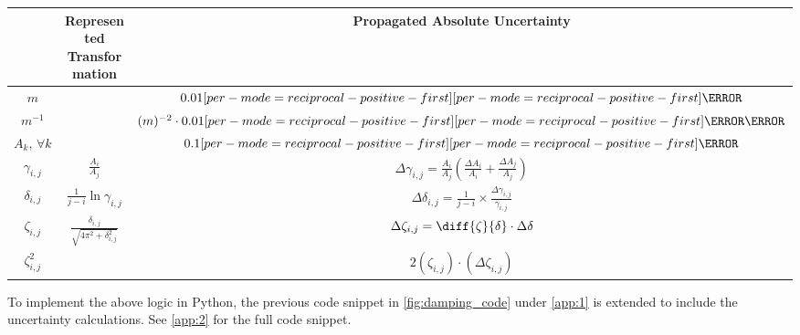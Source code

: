 \documentclass[a4paper,12pt]{article}
\let\oldsi\si
\renewcommand{\si}[1]{\oldsi[per-mode=reciprocal-positive-first]{#1}}
\newcommand{\thcolor}{\cellcolor{Blue!25}}
\newcommand{\chcolor}{\cellcolor{RedOrange!25}}
\begin{document}
\begin{table}[H]
  \begin{center}
    \bgroup
    \renewcommand{\arraystretch}{1.5}
    \begin{tabular}{|c|c|c|}
      \hline
      \thcolor {Variable}       & \thcolor Represented Transformation                   & \thcolor Propagated Absolute Uncertainty                                                          \\ \hline
      $m$                       &                                                       & $0.01\si{\g}$                                                                                     \\ \hline
      \chcolor $m^{-1}$         & \chcolor                                              & \chcolor $(m)^{-2}\cdot 0.01\si{\per\g}$                                                          \\ \hline
      $A_k,\,\forall k$         &                                                       & $0.1\si{\cm}$                                                                                     \\ \hline
      $\gamma_{i,j}$            & $\frac{A_i}{A_{j}}$                                   & $\Delta \gamma_{i, j} = \frac{A_i}{A_{j}}(\frac{\Delta A_i}{A_{i}} + \frac{\Delta A_{j}}{A_{j}})$ \\ \hline
      $\delta_{i,j}$            & $\frac{1}{j - i}\ln{\gamma_{i,j}}$                    & $\Delta \delta_{i,j} = \frac{1}{j - i}\times \frac{\Delta \gamma_{i,j}}{\gamma_{i,j}}$            \\ \hline
      $\zeta_{i, j}$            & $\frac{\delta_{i,j}}{\sqrt{4\pi^2 + \delta_{i,j}^2}}$ & $\Delta \zeta_{i, j} = \diff{\zeta}{\delta} \cdot \Delta\delta$                                   \\ \hline
      \chcolor $\zeta_{i, j}^2$ & \chcolor                                              & \chcolor $2(\zeta_{i, j})\cdot (\Delta \zeta_{i, j})$                                             \\ \hline
    \end{tabular}
    \label{tab:6}
    \egroup
  \end{center}
\end{table}

\vspace{\baselineskip}
To implement the above logic in Python, the previous code snippet in \cref{fig:damping_code} under \cref{app:1} is extended to include the uncertainty calculations. See \cref{app:2} for the full code snippet.
\end{document}
